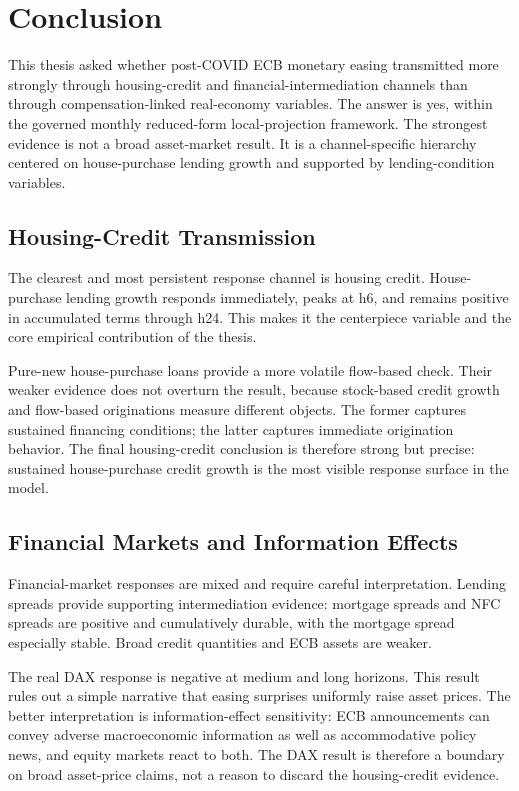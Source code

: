 \chapter{Conclusion}
\label{chap:conclusion}

This thesis asked whether post-COVID ECB monetary easing transmitted more strongly through housing-credit and financial-intermediation channels than through compensation-linked real-economy variables. The answer is yes, within the governed monthly reduced-form local-projection framework. The strongest evidence is not a broad asset-market result. It is a channel-specific hierarchy centered on house-purchase lending growth and supported by lending-condition variables.

\section{Housing-Credit Transmission}

The clearest and most persistent response channel is housing credit. House-purchase lending growth responds immediately, peaks at h6, and remains positive in accumulated terms through h24. This makes it the centerpiece variable and the core empirical contribution of the thesis.

Pure-new house-purchase loans provide a more volatile flow-based check. Their weaker evidence does not overturn the result, because stock-based credit growth and flow-based originations measure different objects. The former captures sustained financing conditions; the latter captures immediate origination behavior. The final housing-credit conclusion is therefore strong but precise: sustained house-purchase credit growth is the most visible response surface in the model.

\section{Financial Markets and Information Effects}

Financial-market responses are mixed and require careful interpretation. Lending spreads provide supporting intermediation evidence: mortgage spreads and NFC spreads are positive and cumulatively durable, with the mortgage spread especially stable. Broad credit quantities and ECB assets are weaker.

The real DAX response is negative at medium and long horizons. This result rules out a simple narrative that easing surprises uniformly raise asset prices. The better interpretation is information-effect sensitivity: ECB announcements can convey adverse macroeconomic information as well as accommodative policy news, and equity markets react to both. The DAX result is therefore a boundary on broad asset-price claims, not a reason to discard the housing-credit evidence.

